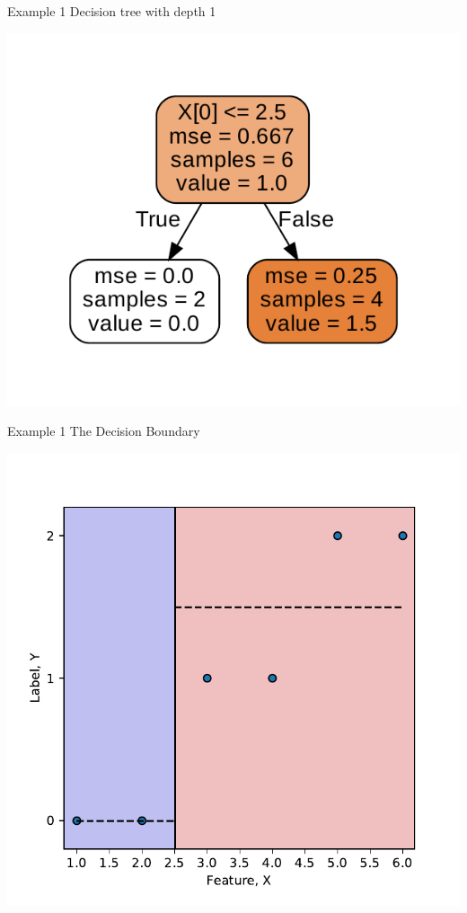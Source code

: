 \documentclass{beamer}
\begin{document}
	\begin{frame}{Example 1}
	Decision tree with depth 1
	\begin{center}
	\includegraphics[scale=1]{depth-1-decision-tree}	
	\end{center}
	\end{frame}

	\begin{frame}{Example 1}
	The Decision Boundary
	\begin{center}
	\includegraphics[scale=0.5]{depth-1-tree}
	\end{center}
	\end{frame}
\end{document}
